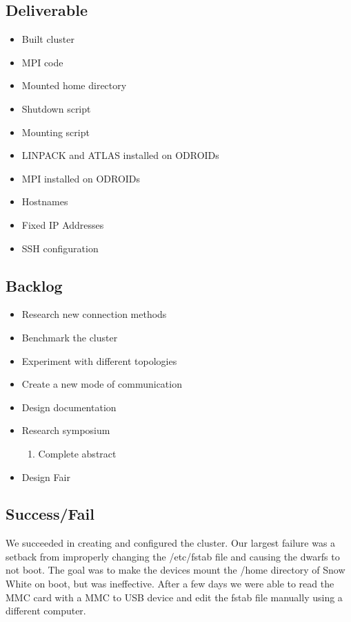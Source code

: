 \subsection{Deliverable}

\begin{itemize}
\item Built cluster
\item MPI code
\item Mounted home directory
\item Shutdown script
\item Mounting script
\item LINPACK and ATLAS installed on ODROIDs
\item MPI installed on ODROIDs
\item Hostnames
\item Fixed IP Addresses
\item SSH configuration
\end{itemize}

\subsection{Backlog}

\begin{itemize}
\item Research new connection methods
\item Benchmark the cluster
\item Experiment with different topologies
\item Create a new mode of communication
\item Design documentation
\item Research symposium
\begin{enumerate}
\item Complete abstract
\end{enumerate}
\item Design Fair
\end{itemize}

\subsection{Success/Fail}

We succeeded in creating and configured the cluster. Our largest failure was a setback from improperly changing the /etc/fstab file and causing the dwarfs to not boot. The goal was to make the devices mount the /home directory of Snow White on boot, but was ineffective. After a few days we were able to read the MMC card with a MMC to USB device and edit the fstab file manually using a different computer.

